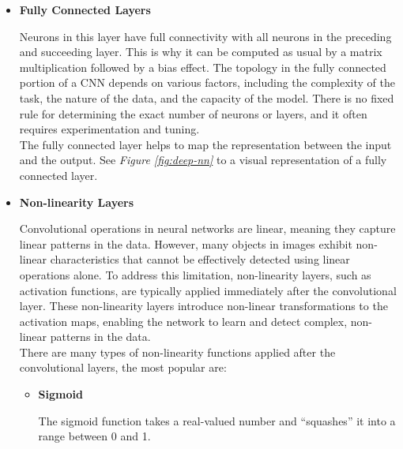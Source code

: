 \begin{itemize}
\item \textbf{Fully Connected Layers}

Neurons in this layer have full connectivity with all neurons in the preceding and succeeding layer. This is why it can be computed as usual by a matrix multiplication followed by a bias effect. The topology in the fully connected portion of a CNN depends on various factors, including the complexity of the task, the nature of the data, and the capacity of the model. There is no fixed rule for determining the exact number of neurons or layers, and it often requires experimentation and tuning. \\

The fully connected layer helps to map the representation between the input and the output. See \textit{Figure \ref{fig:deep-nn}} to a visual representation of a fully connected layer. \\

\item \textbf{Non-linearity Layers}

Convolutional operations in neural networks are linear, meaning they capture linear patterns in the data. However, many objects in images exhibit non-linear characteristics that cannot be effectively detected using linear operations alone. To address this limitation, non-linearity layers, such as activation functions, are typically applied immediately after the convolutional layer. These non-linearity layers introduce non-linear transformations to the activation maps, enabling the network to learn and detect complex, non-linear patterns in the data. \\

There are many types of non-linearity functions applied after the convolutional layers, the most popular are: \\

\begin{itemize}

\item \textbf{Sigmoid}

The sigmoid function takes a real-valued number and “squashes” it into a range between 0 and 1.



\end{itemize}
\end{itemize}
